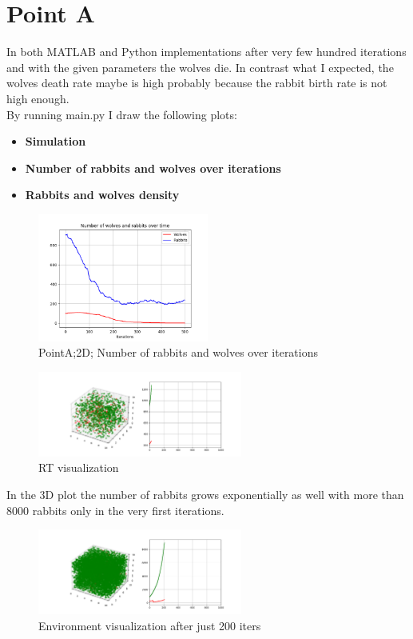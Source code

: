 \documentclass[unicode,11pt,a4paper,oneside,numbers=endperiod,openany]{scrartcl}
\begin{document}
\section*{Point A}
In both MATLAB and Python implementations after very few hundred iterations and with the given parameters the wolves die. In contrast what I expected, the wolves death rate maybe is high probably because the rabbit birth rate is not high enough.\\
By running main.py I draw the following plots:
\begin{itemize}
  \item \textbf{Simulation}
  \item \textbf{Number of rabbits and wolves over iterations}
  \item \textbf{Rabbits and wolves density}
\end{itemize}
\begin{figure}[H]
  \centering
  \includegraphics[width=0.5\textwidth]{output_main/PointA.png}
  \caption{PointA;2D; Number of rabbits and wolves over iterations}
\end{figure}
\begin{figure}[H]
  \centering
  \includegraphics[width=0.6\textwidth]{output3D/3DInitCondition.png}
  \caption{RT visualization}
\end{figure}
In the 3D plot the number of rabbits grows exponentially as well with more than 8000 rabbits only in the very first iterations. 
\begin{figure}[H]
  \centering
  \includegraphics[width=0.6\textwidth]{output3D/secondPlotPointA.png}
  \caption{Environment visualization after just 200 iters} 
\end{figure}
\end{document}
